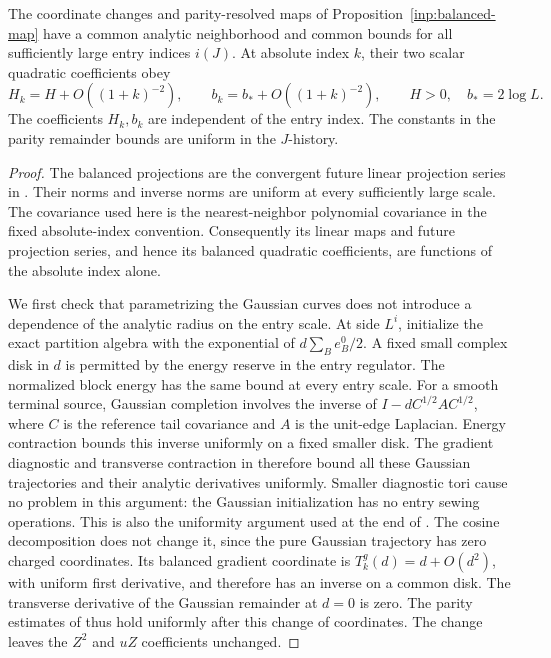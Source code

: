 \begin{lemma}
\label{lem:bulk-parity}
The coordinate changes and parity-resolved maps of
Proposition~\ref{inp:balanced-map} have a common analytic neighborhood
and common bounds for all sufficiently large entry indices $i(J)$.
At absolute index $k$, their two scalar quadratic coefficients obey
\begin{equation}\label{eq:bulk-coefficient-rate}
 H_k=H+O((1+k)^{-2}),\qquad
 b_k=b_*+O((1+k)^{-2}),\qquad
 H>0,\quad b_*=2\log L.
\end{equation}
The coefficients $H_k,b_k$ are independent of the entry index.
The constants in the parity remainder bounds are uniform in the
$J$-history.
\end{lemma}

\begin{proof}
The balanced projections are the convergent future linear projection
series in \cite[Equations (8.17) and
(8.18)]{B}.  Their norms and inverse norms are uniform
at every sufficiently large scale.  The covariance used here is the
nearest-neighbor polynomial covariance in the fixed absolute-index
convention.  Consequently its linear maps and future projection
series, and hence its balanced quadratic coefficients, are functions
of the absolute index alone.

We first check that parametrizing the Gaussian curves does not
introduce a dependence of the analytic radius on the entry scale.
At side $L^i$, initialize the exact partition algebra with the
exponential of $d\sum_B e_B^0/2$.  A fixed small complex disk in $d$
is permitted by the energy reserve in the entry regulator.  The
normalized block energy has the same bound at every entry scale.
For a smooth terminal source, Gaussian completion involves the
inverse of $I-dC^{1/2}AC^{1/2}$, where $C$ is the reference tail
covariance and $A$ is the unit-edge Laplacian.  Energy contraction
bounds this inverse uniformly on a fixed smaller disk.  The
gradient diagnostic and transverse contraction in
\cite[Lemma 10.3]{B} therefore bound all these
Gaussian trajectories and their analytic derivatives uniformly.
Smaller diagnostic tori cause no problem in this argument: the
Gaussian initialization has no entry sewing operations.  This is
also the uniformity argument used at the end of
\cite[Section 5]{X}.  The cosine decomposition
does not change it, since the pure Gaussian trajectory has zero
charged coordinates.  Its balanced gradient coordinate is
$T_k^g(d)=d+O(d^2)$, with uniform first derivative, and therefore
has an inverse on a common disk.  The transverse derivative of the
Gaussian remainder at $d=0$ is zero.  The parity estimates of
\cite[Lemma 10.6]{B} thus hold uniformly after this
change of coordinates.  The change leaves the $Z^2$ and $uZ$
coefficients unchanged.


\end{proof}
